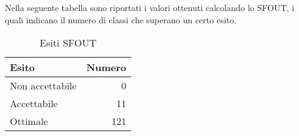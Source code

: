 \newpage
Nella seguente tabella sono riportati i valori ottenuti calcolando lo SFOUT, i quali indicano il numero di classi che superano un certo esito.
\begin{table}[h]

\centering
\begin{tabular}{l r}
	\hline
	\rule[-0.3cm]{0cm}{0.8cm}
	\textbf{Esito} & \textbf{Numero} \\
	\hline
	\rule[0cm]{0cm}{0.4cm}
	Non accettabile & 0 \\
	\rule[0cm]{0cm}{0.4cm}
	Accettabile & 11 \\
	\rule[0cm]{0cm}{0.4cm}
	Ottimale & 121 \\
	\hline
\end{tabular}
\caption{Esiti SFOUT}
\end{table}
